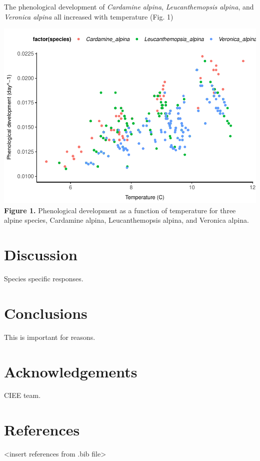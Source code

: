 \documentclass[preprint, 3p,
authoryear]{elsarticle} %
\begin{document}
The phenological development of \emph{Cardamine alpina},
\emph{Leucanthemopsis alpina}, and \emph{Veronica alpina} all increased
with temperature (Fig. 1)

\includegraphics{manuscript_A_files/figure-latex/unnamed-chunk-1-1.pdf}
\textbf{Figure 1.} Phenological development as a function of temperature
for three alpine species, Cardamine alpina, Leucanthemopsis alpina, and
Veronica alpina.

\hypertarget{discussion}{%
\section{Discussion}\label{discussion}}

Species specific responses.

\hypertarget{conclusions}{%
\section{Conclusions}\label{conclusions}}

This is important for reasons.

\hypertarget{acknowledgements}{%
\section{Acknowledgements}\label{acknowledgements}}

CIEE team.

\hypertarget{references}{%
\section{References}\label{references}}

\textless insert references from .bib file\textgreater{}


\end{document}
